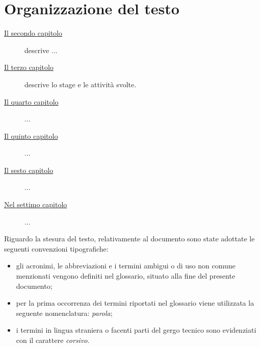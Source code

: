 \section{Organizzazione del testo}

\begin{description}
    \item[{\hyperref[cap:processi-metodologie]{Il secondo capitolo}}] descrive ...
    
    \item[{\hyperref[cap:descrizione-stage]{Il terzo capitolo}}] descrive lo stage e le attività svolte.
    
    \item[{\hyperref[cap:analisi-requisiti]{Il quarto capitolo}}]  ...
    
    \item[{\hyperref[cap:progettazione-codifica]{Il quinto capitolo}}]  ...
    
    \item[{\hyperref[cap:verifica-validazione]{Il sesto capitolo}}]  ...
    
    \item[{\hyperref[cap:conclusioni]{Nel settimo capitolo}}]  ...
\end{description}

Riguardo la stesura del testo, relativamente al documento sono state adottate le seguenti convenzioni tipografiche:
\begin{itemize}
	\item gli acronimi, le abbreviazioni e i termini ambigui o di uso non comune menzionati vengono definiti nel glossario, situato alla fine del presente documento;
	\item per la prima occorrenza dei termini riportati nel glossario viene utilizzata la seguente nomenclatura: \emph{parola}\glsfirstoccur;
	\item i termini in lingua straniera o facenti parti del gergo tecnico sono evidenziati con il carattere \emph{corsivo}.
\end{itemize}
